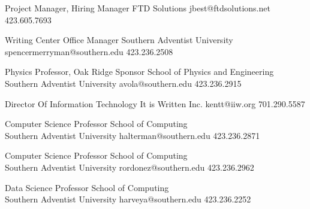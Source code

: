 \begin{multicols}{2}

{Project Manager, Hiring Manager}
{FTD Solutions}
{jbest@ftdsolutions.net}
{423.605.7693}

{Writing Center Office Manager}
{Southern Adventist University}
{spencermerryman@southern.edu}
{423.236.2508}

{Physics Professor, Oak Ridge Sponsor}
{School of Physics and Engineering\\Southern Adventist University}
{avola@southern.edu}
{423.236.2915}

{Director Of Information Technology}
{It is Written Inc.}
{kentt@iiw.org}
{701.290.5587}

\columnbreak
{}
{Computer Science Professor}
{School of Computing\\Southern Adventist University}
{halterman@southern.edu}
{423.236.2871}

{Computer Science Professor}
{School of Computing\\Southern Adventist University}
{rordonez@southern.edu}
{423.236.2962}

{Data Science Professor}
{School of Computing\\Southern Adventist University}
{harveya@southern.edu}
{423.236.2252}

\end{multicols}